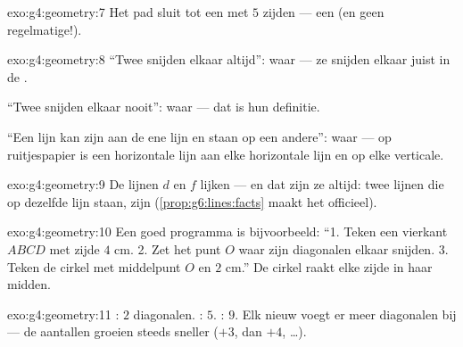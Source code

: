 \begin{solution}{exo:g4:geometry:7}
Het pad sluit tot een  met $5$ zijden --- een  (en geen
regelmatige!).
\end{solution}

\begin{solution}{exo:g4:geometry:8}
``Twee  snijden elkaar altijd'': waar --- ze snijden elkaar
juist in de .

``Twee  snijden elkaar nooit'': waar --- dat is hun
definitie.

``Een lijn kan  zijn aan de ene lijn en  staan op een
andere'': waar --- op ruitjespapier is een horizontale lijn  aan elke
horizontale lijn en  op elke verticale.
\end{solution}

\begin{solution}{exo:g4:geometry:9}
De lijnen $d$ en $f$ lijken  --- en dat zijn ze altijd: twee lijnen
die  op dezelfde lijn staan, zijn 
(\cref{prop:g6:lines:facts} maakt het officieel).
\end{solution}

\begin{solution}{exo:g4:geometry:10}
Een goed programma is bijvoorbeeld: ``1. Teken een vierkant $ABCD$ met zijde
$4$ cm. 2. Zet het punt $O$ waar zijn diagonalen elkaar snijden. 3. Teken de
cirkel met middelpunt $O$ en  $2$ cm.'' De cirkel raakt elke zijde in
haar midden.
\end{solution}

\begin{solution}{exo:g4:geometry:11}
: $2$ diagonalen. : $5$. : $9$. Elk nieuw 
voegt er meer diagonalen bij --- de aantallen groeien steeds sneller ($+3$,
dan $+4$, \dots).
\end{solution}
